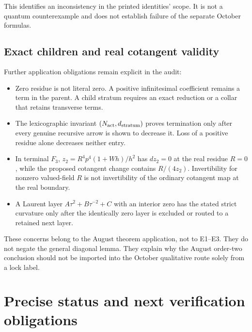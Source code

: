 This identifies an inconsistency in the printed identities' scope.
It is not a quantum counterexample and does not establish failure
of the separate October formulas. 

\subsection{Exact children and real cotangent validity}

Further application obligations remain explicit in the audit:
\begin{itemize}
\item Zero residue is not literal zero. A positive infinitesimal
coefficient remains a term in the parent. A child stratum requires
an exact reduction or a collar that retains transverse terms.
\item The lexicographic invariant
\((N_{\rm act},d_{\rm stratum})\) proves termination only after
every genuine recursive arrow is shown to decrease it.
Loss of a positive residue alone decreases neither entry.
\item In terminal \(F_3\),
\(z_2=R^4p^4(1+Wh)/h^2\) has \(dz_2=0\) at the real residue \(R=0\),
while the proposed cotangent change contains \(R/(4z_2)\).
Invertibility for nonzero valued-field \(R\) is not invertibility
of the ordinary cotangent map at the real boundary.
\item A Laurent layer \(A\tau^2+B\tau^{-2}+C\) with an interior zero
has the stated strict curvature only after the identically zero
layer is excluded or routed to a retained next layer.
\end{itemize}

These concerns belong to the August theorem application, not to
E1--E3. They do not negate the general diagonal lemma. They explain
why the August order-two conclusion should not be imported into
the October qualitative route solely from a lock label.

\section{Precise status and next verification obligations}

